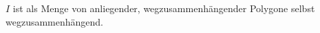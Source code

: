 \begin{lemma}
    $I$ ist als Menge von anliegender, wegzusammenhängender Polygone selbst wegzusammenhängend.
\end{lemma}